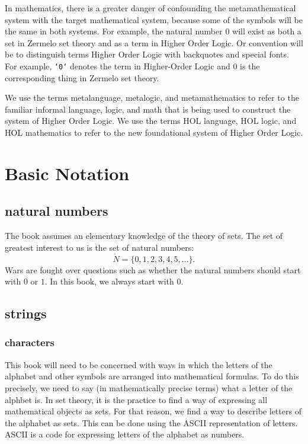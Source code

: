 \documentclass[cup9a]{cupbook}
\begin{document}
In mathematics, there is a greater danger of confounding the metamathematical system with the target mathematical system, because some of the symbols will be the same in both systems.  For example, the natural number $0$ will exist as both a set in Zermelo set theory and as a term in Higher Order Logic.   Or convention will be to distinguish terms Higher Order Logic with backquotes and special fonts.  For example, {\tt `0`} denotes the term in Higher-Order Logic and $0$ is the corresponding thing in Zermelo set theory.

We use the terms metalanguage, metalogic, and metamathematics to refer to the familiar informal language, logic, and math that is being used to construct the system of Higher Order Logic.  We use the terms HOL language, HOL logic, and HOL mathematics to refer to the new foundational system of Higher Order Logic. 


\chapter{Basic Notation}

\section{natural numbers}

The book assumes an elementary knowledge of the theory of sets.  The set of greatest interest to us is the set of natural numbers:
$$
\ring{N}=\{0,1,2,3,4,5,\ldots\}.
$$
Wars are fought over questions such as whether the natural numbers should start with $0$ or $1$.  In this book, we always start with $0$.

\section{strings}

\subsection{characters}

This book will need to be concerned with ways in which the letters of the alphabet and other symbols are arranged into mathematical formulas.   To do this precisely, we need to say (in mathematically precise terms) what a letter of the alphbet is.  In set theory, it is the practice to find a way of expressing all mathematical objects as sets.   For that reason, we find a way to describe letters of the alphabet as sets.  This can be done using the ASCII representation of letters.  ASCII is a code for expressing letters of the alphabet as numbers.
\end{document}
